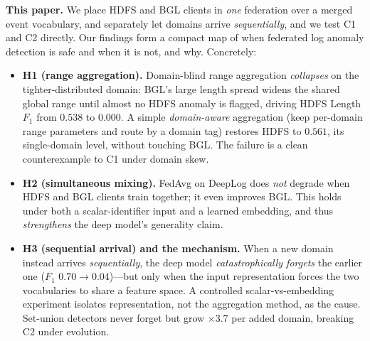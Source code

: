 \documentclass[journal]{IEEEtran}
\begin{document}
\textbf{This paper.} We place HDFS and BGL clients in \emph{one} federation over a merged event
vocabulary, and separately let domains arrive \emph{sequentially}, and we test C1 and C2 directly.
Our findings form a compact map of when federated log anomaly detection is safe and when it is
not, and why. Concretely:

\begin{itemize}
\item \textbf{H1 (range aggregation).} Domain-blind range aggregation \emph{collapses} on the
tighter-distributed domain: BGL's large length spread widens the shared global range until almost
no HDFS anomaly is flagged, driving HDFS Length $F_1$ from $0.538$ to $0.000$. A simple
\emph{domain-aware} aggregation (keep per-domain range parameters and route by a domain tag) restores
HDFS to $0.561$, its single-domain level, without touching BGL. The failure is a clean
counterexample to C1 under domain skew.
\item \textbf{H2 (simultaneous mixing).} FedAvg on DeepLog does \emph{not} degrade when HDFS and
BGL clients train together; it even improves BGL. This holds under both a scalar-identifier input
and a learned embedding, and thus \emph{strengthens} the deep model's generality claim.
\item \textbf{H3 (sequential arrival) and the mechanism.} When a new domain instead arrives
\emph{sequentially}, the deep model \emph{catastrophically forgets} the earlier one
($F_1$ $0.70\!\rightarrow\!0.04$)---but only when the input representation forces the two
vocabularies to share a feature space. A controlled scalar-vs-embedding experiment isolates
representation, not the aggregation method, as the cause. Set-union detectors never forget but
grow $\times3.7$ per added domain, breaking C2 under evolution.
\end{itemize}
\end{document}
